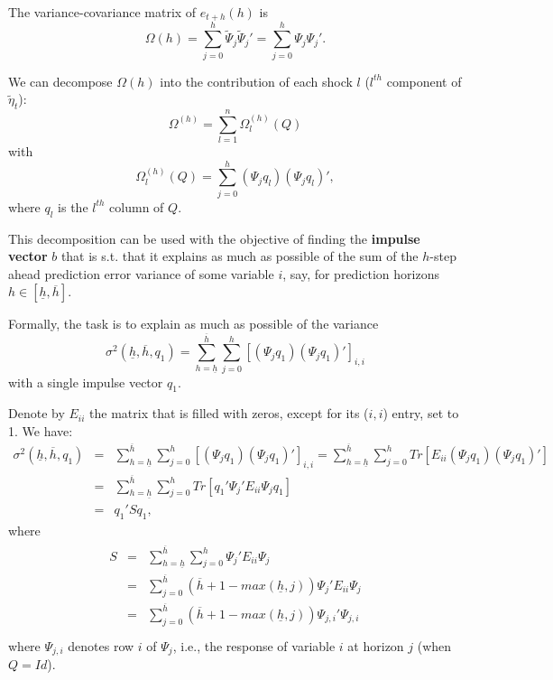 \documentclass[
]{book}
\theoremstyle{definition}
\theoremstyle{definition}
\theoremstyle{definition}
\theoremstyle{definition}
\theoremstyle{remark}
\begin{document}
The variance-covariance matrix of \(e_{t+h}(h)\) is
\[
\Omega(h)=\sum_{j=0}^h\tilde \Psi_j\tilde \Psi_j'=\sum_{j=0}^h \Psi_j \Psi_j'.
\]

We can decompose \(\Omega(h)\) into the contribution of each shock \(l\) (\(l^{th}\) component of \(\tilde{\eta}_t\)):
\[
\Omega^{(h)}=\sum_{l=1}^n\Omega_l^{(h)}(Q)
\]
with
\[
\Omega_l^{(h)}(Q) =\sum_{j=0}^h(\Psi_jq_l)(\Psi_jq_l)',
\]
where \(q_l\) is the \(l^{th}\) column of \(Q\).

This decomposition can be used with the objective of finding the \textbf{impulse vector} \(b\) that is s.t. that it explains as much as possible of the sum of the \(h\)-step ahead prediction error variance of some variable \(i\), say, for prediction horizons \(h \in [\underline{h} , \overline{h}]\).

Formally, the task is to explain as much as possible of the variance
\[
\sigma^2(\underline{h},\overline{h},q_1)=\sum_{h=\underline{h}}^{\overline{h}} \sum_{j=0}^h\left[(\Psi_jq_1)(\Psi_jq_1)'\right]_{i,i}
\]
with a single impulse vector \(q_1\).

Denote by \(E_{ii}\) the matrix that is filled with zeros, except for its (\(i,i\)) entry, set to 1. We have:
\begin{eqnarray*}
\sigma^2(\underline{h},\overline{h},q_1)&=&\sum_{h=\underline{h}}^{\overline{h}} \sum_{j=0}^h\left[(\Psi_jq_1)(\Psi_jq_1)'\right]_{i,i}=\sum_{h=\underline{h}}^{\overline{h}} \sum_{j=0}^h Tr\left[E_{ii}(\Psi_jq_1)(\Psi_jq_1)'\right]\\
&=&\sum_{h=\underline{h}}^{\overline{h}} \sum_{j=0}^h Tr\left[q_1'\Psi_j'E_{ii}\Psi_j q_1\right]\\
&=& q_1'Sq_1,
\end{eqnarray*}
where
\begin{eqnarray*}
\begin{array}{lll}S&=&\sum_{h=\underline{h}}^{\overline{h}}\sum_{j=0}^{h}\Psi_j'E_{ii}\Psi_j\\
&=&\sum_{j=0}^{\overline{h}}(\overline{h}+1-max(\underline{h},j))\Psi_j'E_{ii}\Psi_j\\
&=&\sum_{j=0}^{\overline{h}}(\overline{h}+1-max(\underline{h},j))\Psi_{j,i}'\Psi_{j,i}\\
\end{array}
\end{eqnarray*}
where \(\Psi_{j,i}\) denotes row \(i\) of \(\Psi_{j}\), i.e., the response of variable \(i\) at horizon \(j\) (when \(Q=Id\)).
\end{document}
